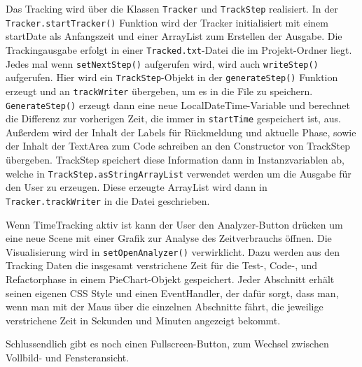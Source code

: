 \documentclass[10pt]{article}
\begin{document}
Das Tracking wird über die Klassen \verb+Tracker+ und \verb+TrackStep+ realisiert.
In der \verb+Tracker.startTracker()+ Funktion wird der Tracker initialisiert mit einem startDate als Anfangszeit und einer ArrayList zum Erstellen der Ausgabe. Die Trackingausgabe erfolgt in einer \verb+Tracked.txt+-Datei die im Projekt-Ordner liegt. Jedes mal wenn \verb+setNextStep()+ aufgerufen wird, wird auch \verb+writeStep()+ aufgerufen. Hier wird ein \verb+TrackStep+-Objekt in der \verb+generateStep()+ Funktion erzeugt und an \verb+trackWriter+ übergeben, um es in die File zu speichern. \verb+GenerateStep()+ erzeugt dann eine neue LocalDateTime-Variable und berechnet die Differenz zur vorherigen Zeit, die immer in \verb+startTime+ gespeichert ist, aus. Außerdem wird der Inhalt der Labels für Rückmeldung und aktuelle Phase, sowie der Inhalt der TextArea zum Code schreiben an den Constructor von TrackStep übergeben.
TrackStep speichert diese Information dann in Instanzvariablen ab, welche in \verb+TrackStep.asStringArrayList+ verwendet werden um die Ausgabe für den User zu erzeugen. Diese erzeugte ArrayList wird dann in \verb+Tracker.trackWriter+ in die Datei geschrieben.

Wenn TimeTracking aktiv ist kann der User den Analyzer-Button drücken um eine neue Scene mit einer Grafik zur Analyse des Zeitverbrauchs öffnen. Die Visualisierung wird in \verb+setOpenAnalyzer()+ verwirklicht. Dazu werden aus den Tracking Daten die insgesamt verstrichene Zeit für die Test-, Code-, und Refactorphase in einem PieChart-Objekt gespeichert. Jeder Abschnitt erhält seinen eigenen CSS Style und einen EventHandler, der dafür sorgt, dass man, wenn man mit der Maus über die einzelnen Abschnitte fährt, die jeweilige verstrichene Zeit in Sekunden und Minuten angezeigt bekommt.

Schlussendlich gibt es noch einen Fullscreen-Button, zum Wechsel zwischen Vollbild- und Fensteransicht.
\end{document}
